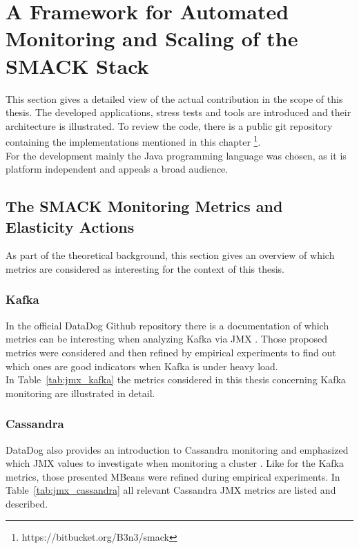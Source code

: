 \chapter{A Framework for Automated Monitoring and Scaling of the SMACK Stack}
\label{ch:implementation}

This section gives a detailed view of the actual contribution in the scope of this thesis.
The developed applications, stress tests and tools are introduced and their architecture is illustrated.
To review the code, there is a public git repository containing the implementations mentioned in this chapter \footnote{https://bitbucket.org/B3n3/smack}.\\
For the development mainly the Java programming language was chosen, as it is platform independent and appeals a broad audience.

\section{The SMACK Monitoring Metrics and Elasticity Actions}
As part of the theoretical background, this section gives an overview of which metrics are considered as interesting for the context of this thesis.\\

\subsection{Kafka}
In the official DataDog Github repository there is a documentation of which metrics can be interesting when analyzing Kafka via JMX \cite{datadog_kafka}.
Those proposed metrics were considered and then refined by empirical experiments to find out which ones are good indicators when Kafka is under heavy load.\\
In Table~\ref{tab:jmx_kafka} the metrics considered in this thesis concerning Kafka monitoring are illustrated in detail.

\subsection{Cassandra}
DataDog also provides an introduction to Cassandra monitoring and emphasized which JMX values to investigate when monitoring a cluster \cite{datadog_cassandra}.
Like for the Kafka metrics, those presented MBeans were refined during empirical experiments.
In Table~\ref{tab:jmx_cassandra} all relevant Cassandra JMX metrics are listed and described.

